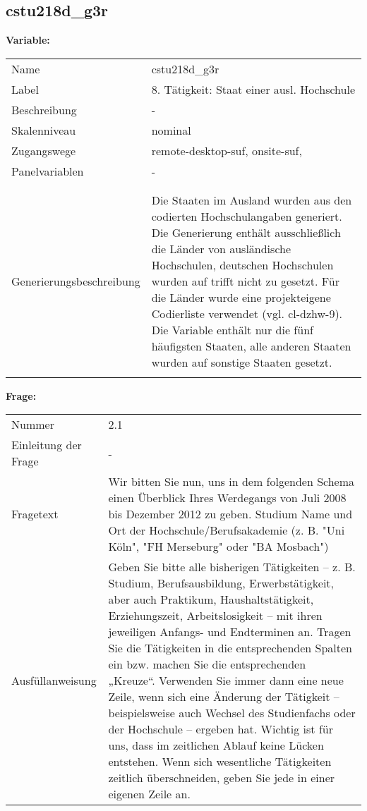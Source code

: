 	
	
	\subsection{cstu218d\_g3r}
	\label{subSection:cstu218d_g3r}

	\noindent\textbf{Variable:}\\
		\begin{tabular}{lL{11.3cm}}
			\label{tableVariable:cstu218d_g3r}
			Name & cstu218d\_g3r \\
			Label & 8. Tätigkeit: Staat einer ausl. Hochschule \\
			Beschreibung & - \\
			Skalenniveau & nominal \\
			Zugangswege &
				remote-desktop-suf,
				onsite-suf,
 \\
			Panelvariablen & -
			 \\
			 \\
 \\
					Generierungsbeschreibung & Die Staaten im Ausland wurden aus den codierten Hochschulangaben generiert. Die Generierung enthält ausschließlich die Länder von ausländische Hochschulen, deutschen Hochschulen wurden auf trifft nicht zu gesetzt. Für die Länder wurde eine projekteigene Codierliste verwendet (vgl. cl-dzhw-9). Die Variable enthält nur die fünf häufigsten Staaten, alle anderen Staaten wurden auf sonstige Staaten gesetzt. 
				 \\	
			 \\
		\end{tabular}

		\vspace*{1 cm}
		\noindent\textbf{Frage:}\\
		\begin{tabular}{lL{11.3cm}}
			\label{tableQuestion:cstu218d_g3r}
			Nummer & 2.1 \\
			Einleitung der Frage & - \\
			Fragetext & Wir bitten Sie nun, uns in dem folgenden Schema einen Überblick Ihres Werdegangs von Juli 2008 bis Dezember 2012 zu geben.
Studium
Name und Ort der Hochschule/Berufsakademie
(z. B. "Uni Köln", "FH Merseburg" oder "BA Mosbach") \\
			Ausfüllanweisung & Geben Sie bitte alle bisherigen Tätigkeiten – z. B. Studium, Berufsausbildung, Erwerbstätigkeit, aber auch Praktikum, Haushaltstätigkeit,
Erziehungszeit, Arbeitslosigkeit – mit ihren jeweiligen Anfangs- und Endterminen an. Tragen Sie die Tätigkeiten in die entsprechenden Spalten ein bzw. machen Sie die entsprechenden „Kreuze“. Verwenden Sie immer dann eine neue Zeile, wenn sich eine Änderung der Tätigkeit – beispielsweise auch Wechsel des Studienfachs oder der Hochschule – ergeben hat. Wichtig ist für uns, dass im zeitlichen Ablauf keine Lücken entstehen. Wenn sich wesentliche Tätigkeiten zeitlich überschneiden, geben Sie jede in einer eigenen Zeile an. \\
		\end{tabular}





